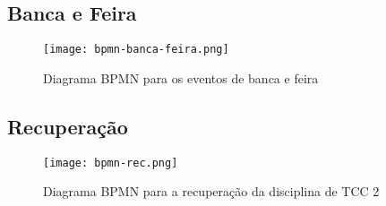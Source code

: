 \subsection{Banca e Feira}
\begin{figure}[H]
    \centering
    \texttt{[image: bpmn-banca-feira.png]}
    \caption{Diagrama BPMN para os eventos de banca e feira}
    \label{fig:bpmn-banca-feira}
\end{figure}

\subsection{Recuperação}
\begin{figure}[H]
    \centering
    \texttt{[image: bpmn-rec.png]}
    \caption{Diagrama BPMN para a recuperação da disciplina de TCC 2}
    \label{fig:bpmn-rec}
\end{figure}
